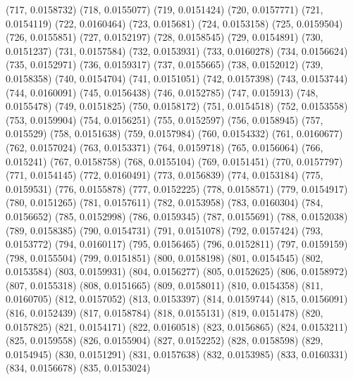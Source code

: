 {					(717, 0.0158732)
					(718, 0.0155077)
					(719, 0.0151424)
					(720, 0.0157771)
					(721, 0.0154119)
					(722, 0.0160464)
					(723, 0.015681)
					(724, 0.0153158)
					(725, 0.0159504)
					(726, 0.0155851)
					(727, 0.0152197)
					(728, 0.0158545)
					(729, 0.0154891)
					(730, 0.0151237)
					(731, 0.0157584)
					(732, 0.0153931)
					(733, 0.0160278)
					(734, 0.0156624)
					(735, 0.0152971)
					(736, 0.0159317)
					(737, 0.0155665)
					(738, 0.0152012)
					(739, 0.0158358)
					(740, 0.0154704)
					(741, 0.0151051)
					(742, 0.0157398)
					(743, 0.0153744)
					(744, 0.0160091)
					(745, 0.0156438)
					(746, 0.0152785)
					(747, 0.015913)
					(748, 0.0155478)
					(749, 0.0151825)
					(750, 0.0158172)
					(751, 0.0154518)
					(752, 0.0153558)
					(753, 0.0159904)
					(754, 0.0156251)
					(755, 0.0152597)
					(756, 0.0158945)
					(757, 0.015529)
					(758, 0.0151638)
					(759, 0.0157984)
					(760, 0.0154332)
					(761, 0.0160677)
					(762, 0.0157024)
					(763, 0.0153371)
					(764, 0.0159718)
					(765, 0.0156064)
					(766, 0.015241)
					(767, 0.0158758)
					(768, 0.0155104)
					(769, 0.0151451)
					(770, 0.0157797)
					(771, 0.0154145)
					(772, 0.0160491)
					(773, 0.0156839)
					(774, 0.0153184)
					(775, 0.0159531)
					(776, 0.0155878)
					(777, 0.0152225)
					(778, 0.0158571)
					(779, 0.0154917)
					(780, 0.0151265)
					(781, 0.0157611)
					(782, 0.0153958)
					(783, 0.0160304)
					(784, 0.0156652)
					(785, 0.0152998)
					(786, 0.0159345)
					(787, 0.0155691)
					(788, 0.0152038)
					(789, 0.0158385)
					(790, 0.0154731)
					(791, 0.0151078)
					(792, 0.0157424)
					(793, 0.0153772)
					(794, 0.0160117)
					(795, 0.0156465)
					(796, 0.0152811)
					(797, 0.0159159)
					(798, 0.0155504)
					(799, 0.0151851)
					(800, 0.0158198)
					(801, 0.0154545)
					(802, 0.0153584)
					(803, 0.0159931)
					(804, 0.0156277)
					(805, 0.0152625)
					(806, 0.0158972)
					(807, 0.0155318)
					(808, 0.0151665)
					(809, 0.0158011)
					(810, 0.0154358)
					(811, 0.0160705)
					(812, 0.0157052)
					(813, 0.0153397)
					(814, 0.0159744)
					(815, 0.0156091)
					(816, 0.0152439)
					(817, 0.0158784)
					(818, 0.0155131)
					(819, 0.0151478)
					(820, 0.0157825)
					(821, 0.0154171)
					(822, 0.0160518)
					(823, 0.0156865)
					(824, 0.0153211)
					(825, 0.0159558)
					(826, 0.0155904)
					(827, 0.0152252)
					(828, 0.0158598)
					(829, 0.0154945)
					(830, 0.0151291)
					(831, 0.0157638)
					(832, 0.0153985)
					(833, 0.0160331)
					(834, 0.0156678)
					(835, 0.0153024)
}
